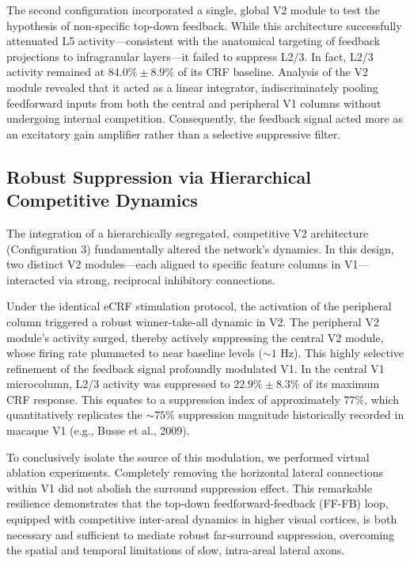 The second configuration incorporated a single, global V2 module to test the hypothesis of non-specific top-down feedback. While this architecture successfully attenuated L5 activity—consistent with the anatomical targeting of feedback projections to infragranular layers—it failed to suppress L2/3. In fact, L2/3 activity remained at $84.0\% \pm 8.9\%$ of its CRF baseline. Analysis of the V2 module revealed that it acted as a linear integrator, indiscriminately pooling feedforward inputs from both the central and peripheral V1 columns without undergoing internal competition. Consequently, the feedback signal acted more as an excitatory gain amplifier rather than a selective suppressive filter.

\subsection{Robust Suppression via Hierarchical Competitive Dynamics}
The integration of a hierarchically segregated, competitive V2 architecture (Configuration 3) fundamentally altered the network's dynamics. In this design, two distinct V2 modules—each aligned to specific feature columns in V1—interacted via strong, reciprocal inhibitory connections. 

Under the identical eCRF stimulation protocol, the activation of the peripheral column triggered a robust winner-take-all dynamic in V2. The peripheral V2 module's activity surged, thereby actively suppressing the central V2 module, whose firing rate plummeted to near baseline levels ($\sim 1$ Hz). This highly selective refinement of the feedback signal profoundly modulated V1. In the central V1 microcolumn, L2/3 activity was suppressed to $22.9\% \pm 8.3\%$ of its maximum CRF response. This equates to a suppression index of approximately $77\%$, which quantitatively replicates the $\sim 75\%$ suppression magnitude historically recorded in macaque V1 (e.g., Busse et al., 2009). 

To conclusively isolate the source of this modulation, we performed virtual ablation experiments. Completely removing the horizontal lateral connections within V1 did not abolish the surround suppression effect. This remarkable resilience demonstrates that the top-down feedforward-feedback (FF-FB) loop, equipped with competitive inter-areal dynamics in higher visual cortices, is both necessary and sufficient to mediate robust far-surround suppression, overcoming the spatial and temporal limitations of slow, intra-areal lateral axons.


